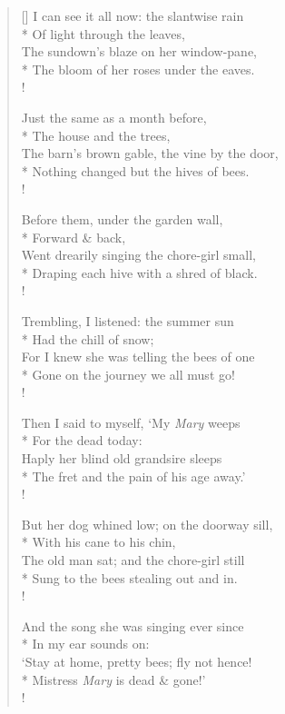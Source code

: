 \documentclass[MAIN]{subfiles}
\begin{document}
\begin{verse}[\versewidth]
I can see it all now: the slantwise rain\\*
\vin Of light through the leaves,\\
The sundown’s blaze on her window-pane,\\* 
\vin The bloom of her roses under the eaves.\\!

Just the same as a month before,\\*
\vin The house and the trees,\\
The barn's brown gable, the vine by the door,\\*
\vin Nothing changed but the hives of bees.\\!

Before them, under the garden wall,\\*
\vin Forward \& back,\\
Went drearily singing the chore-girl small,\\*
\vin Draping each hive with a shred of black.\\!

Trembling, I listened: the summer sun\\*
\vin Had the chill of snow;\\
For I knew she was telling the bees of one\\*
\vin Gone on the journey we all must go!\\!

Then I said to myself, `My \emph{Mary} weeps\\* 
\vin For the dead today:\\
Haply her blind old grandsire sleeps\\*
\vin The fret and the pain of his age away.'\\!

But her dog whined low; on the doorway sill,\\*
\vin With his cane to his chin,\\
The old man sat; and the chore-girl still\\*
\vin Sung to the bees stealing out and in.\\!

And the song she was singing ever since\\*
\vin In my ear sounds on:\\
`Stay at home, pretty bees; fly not hence!\\*
\vin Mistress \emph{Mary} is dead \& gone!'\\!
\end{verse}
\end{document}
